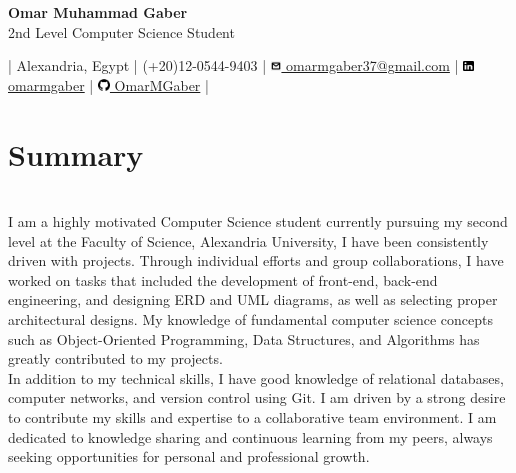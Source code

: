 \documentclass[a4paper,12pt]{article}
\begin{document}
	\begin{center}
		\Huge \textbf{Omar Muhammad Gaber} \\ \small{2nd Level Computer Science Student}
	\end{center}

	\begin{flushleft}
		\begin{center}
			\footnotesize
			{
				| Alexandria, Egypt |
				(+20)12-0544-9403 |
				\href{mailto:omarmgaber37@gmail.com}{\includegraphics[height=8pt]{images/gmail-logo.png}  omarmgaber37@gmail.com} |			
				\href{https://www.linkedin.com/in/omarmgaber/}{\includegraphics[height=8pt]{images/linkedIn-logo.png} omarmgaber} |
				\href{https://github.com/OmarMGaber}{\includegraphics[height=9pt]{images/github-logo.png} OmarMGaber} |
			}
		\end{center}
	\end{flushleft}

	\section{Summary}
			
		\textit{\\}I am a highly motivated Computer Science student currently pursuing my second level at the Faculty of Science, Alexandria University, I have been consistently driven with projects. Through individual efforts and group collaborations, I have worked on tasks that included the development of front-end, back-end engineering, and designing ERD and UML diagrams, as well as selecting proper architectural designs. My knowledge of fundamental computer science concepts such as Object-Oriented Programming, Data Structures, and Algorithms has greatly contributed to my projects.\\

		In addition to my technical skills, I have good knowledge of relational databases, computer networks, and version control using Git. I am driven by a strong desire to contribute my skills and expertise to a collaborative team environment. I am dedicated to knowledge sharing and continuous learning from my peers, always seeking opportunities for personal and professional growth.\\
\end{document}
